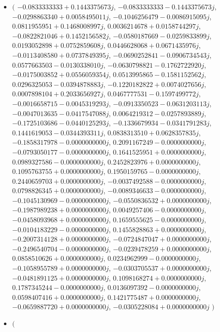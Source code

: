 \documentclass[14pt,a4paper]{article}
\begin{document}
\begin{itemize}
\item
$\big($
$-0.0833333333+0.1443375673j$, $-0.0833333333-0.1443375673j$, $-0.0298863340+0.0058495011j$, $-0.1046256479-0.0086915095j$, $0.0811955951+0.1468008997j$, $0.0036214678+0.0158744297j$, $-0.0822821046+0.1452156582j$, $-0.0580187669-0.0259833899j$, $0.0193052898+0.0752859608j$, $0.0446628068+0.0671435976j$, $-0.0113408580+0.0737849395j$, $-0.0690252841-0.0906734543j$, $0.0577663503-0.0130338010j$, $-0.0630798821-0.1762722920j$, $-0.0175003852+0.0556059354j$, $0.0513995865-0.1581152562j$, $0.0296325053-0.0394878883j$, $-0.1220182822+0.0074027656j$, $0.0007898104+0.2033656927j$, $0.0467777531-0.1597499772j$, $-0.0016658715-0.0045319293j$, $-0.0913350523-0.0631203113j$, $-0.0047013635-0.0417547088j$, $0.0064219312-0.0257893889j$, $-0.1725103686-0.0440125293j$, $-0.1336679934-0.0341791283j$, $0.1441619053-0.0344393311j$, $0.0838313510+0.0628357835j$, $-0.1858317978-0.0000000000j$, $0.2091167249-0.0000000000j$, $-0.0793050177-0.0000000000j$, $0.1641525951+0.0000000000j$, $0.0989327586-0.0000000000j$, $0.2452823976+0.0000000000j$, $0.1095763755+0.0000000000j$, $0.1950159765-0.0000000000j$, $0.2440659703+0.0000000000j$, $-0.0037492588-0.0000000000j$, $0.0798826345+0.0000000000j$, $-0.0089346633-0.0000000000j$, $-0.1045130969-0.0000000000j$, $-0.0550836532+0.0000000000j$, $-0.1987989238+0.0000000000j$, $0.0049257406-0.0000000000j$, $-0.0458093968+0.0000000000j$, $0.1659555625-0.0000000000j$, $-0.0104183229-0.0000000000j$, $0.1455828863+0.0000000000j$, $-0.2007314128+0.0000000000j$, $-0.0724847047+0.0000000000j$, $-0.2496540704-0.0000000000j$, $-0.0239478259+0.0000000000j$, $0.0858510626+0.0000000000j$, $0.0234962999-0.0000000000j$, $-0.1058955789+0.0000000000j$, $-0.0303705537+0.0000000000j$, $-0.0481891125+0.0000000000j$, $0.1098168274+0.0000000000j$, $0.1787345244-0.0000000000j$, $0.0136097392-0.0000000000j$, $0.0598407416+0.0000000000j$, $0.1421775487+0.0000000000j$, $-0.0659887720+0.0000000000j$, $-0.0305228084+0.0000000000j$
$\big)$
\item
$\big($

\end{itemize}
\end{document}
